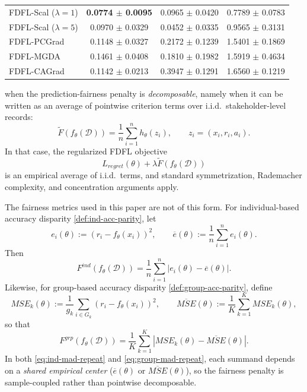 \documentclass[ijoc,sglanonrev]{informs4}
\begin{document}
\begin{table}[htbp]
\begin{tabular}{lccc}
FDFL-Scal ($\lambda=1$) 
    & \textbf{0.0774 $\pm$ 0.0095} & 0.0965 $\pm$ 0.0420 & 0.7789 $\pm$ 0.0783 \\
FDFL-Scal ($\lambda=5$) 
    & 0.0970 $\pm$ 0.0329 & 0.0452 $\pm$ 0.0335 & 0.9565 $\pm$ 0.3131 \\
FDFL-PCGrad 
    & 0.1148 $\pm$ 0.0327 & 0.2172 $\pm$ 0.1239 & 1.5401 $\pm$ 0.1869 \\
FDFL-MGDA 
    & 0.1461 $\pm$ 0.0408 & 0.1810 $\pm$ 0.1982 & 1.5919 $\pm$ 0.4634 \\
FDFL-CAGrad 
    & 0.1142 $\pm$ 0.0213 & 0.3947 $\pm$ 0.1291 & 1.6560 $\pm$ 0.1219 \\
\bottomrule
\end{tabular}
\end{table}

when the prediction-fairness penalty is
\emph{decomposable}, namely when it can be written as an average of pointwise criterion terms
over i.i.d.\ stakeholder-level records:
\begin{equation}
\label{eq:decomp-fair}
\widetilde F(f_\theta(\mathcal D))
=
\frac{1}{n}\sum_{i=1}^n h_\theta(z_i),
\qquad
z_i=(x_i,r_i,a_i).
\end{equation}
In that case, the regularized FDFL objective
\[
L_{regret}(\theta)+\lambda \widetilde F(f_\theta(\mathcal D))
\]
is an empirical average of i.i.d.\ terms, and standard symmetrization, Rademacher complexity,
and concentration arguments apply.

The fairness metrics used in this paper are not of this form.
For individual-based accuracy disparity \eqref{def:ind-acc-parity}, let
\[
e_i(\theta):=(r_i-f_\theta(x_i))^2,
\qquad
\overline e(\theta):=\frac{1}{n}\sum_{i=1}^n e_i(\theta).
\]
Then
\begin{equation}
\label{eq:ind-mad-repeat}
F^{ind}(f_\theta(\mathcal D))
=
\frac{1}{n}\sum_{i=1}^n |e_i(\theta)-\overline e(\theta)|.
\end{equation}
Likewise, for group-based accuracy disparity \eqref{def:group-acc-parity}, define
\[
MSE_k(\theta):=\frac{1}{g_k}\sum_{i\in G_k}(r_i-f_\theta(x_i))^2,
\qquad
\overline{MSE}(\theta):=\frac{1}{K}\sum_{k=1}^K MSE_k(\theta),
\]
so that
\begin{equation}
\label{eq:group-mad-repeat}
F^{grp}(f_\theta(\mathcal D))
=
\frac{1}{K}\sum_{k=1}^K |MSE_k(\theta)-\overline{MSE}(\theta)|.
\end{equation}
In both \eqref{eq:ind-mad-repeat} and \eqref{eq:group-mad-repeat}, each summand depends on a
\emph{shared empirical center} ($\overline e(\theta)$ or $\overline{MSE}(\theta)$), so the fairness
penalty is sample-coupled rather than pointwise decomposable.
\end{document}
